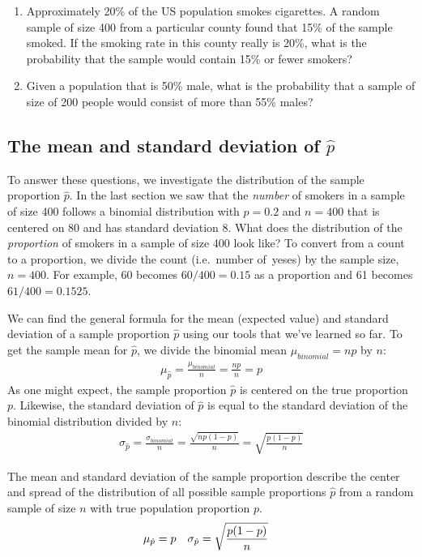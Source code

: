 \begin{enumerate}
\item Approximately 20\% of the US population smokes cigarettes. A random sample of size 400 from a particular county found that 15\% of the sample smoked. If the smoking rate in this county really is 20\%, what is the probability that the sample would contain 15\% or fewer smokers?  

\item Given a population that is 50\% male, what is the probability that a sample of size of 200 people would consist of more than 55\% males?

\end{enumerate}

\subsection{The mean and standard deviation of $\hat{p}$}

To answer these questions, we investigate the distribution of the sample proportion $\hat{p}$. In the last section we saw that the \emph{number} of smokers in a sample of size 400 follows a binomial distribution with $p=0.2$ and $n=400$ that is centered on 80 and has standard deviation 8. What does the distribution of the \emph{proportion} of smokers in a sample of size 400 look like?  To convert from a count to a proportion, we divide the count (i.e.~number of~yeses) by the sample size, $n = 400$. For example, 60 becomes $60/400 = 0.15$ as a proportion and 61 becomes $61/400 = 0.1525$. 

We can find the general formula for the mean (expected value) and standard deviation of a sample proportion $\hat{p}$ using our tools that we've learned so far. To get the sample mean for $\hat{p}$, we divide the binomial mean $\mu_{binomial} = np$ by $n$:
\begin{align*}
\mu_{\hat{p}} = \frac{\mu_{binomial}}{n} = \frac{np}{n} = p
\end{align*}
As one might expect, the sample proportion $\hat{p}$ is centered on the true proportion $p$. Likewise, the standard deviation of $\hat{p}$ is equal to the standard deviation of the binomial distribution divided by $n$:
\begin{align*}
\sigma_{\hat{p}}
	= \frac{\sigma_{binomial}}{n}
	= \frac{\sqrt{np(1-p)}}{n}
	= \sqrt{\frac{p(1-p)}{n}}
\end{align*}

\begin{termBox}{
The mean and standard deviation of the sample proportion describe the center and spread of the distribution of all possible sample proportions $\hat{p}$ from a random sample of size $n$ with true population proportion $p$.
\begin{align*}
\mu_{\hat{p}} &= p
	& \sigma_{\hat{p}}&= \sqrt{\frac{p(1-p)}{n}}
	\vspace{1mm}
\end{align*}}
\end{termBox}

